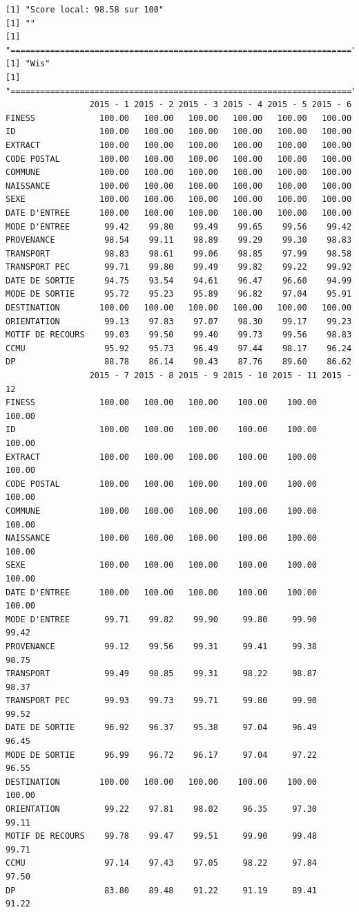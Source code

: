 \documentclass[]{article}
\begin{document}
\begin{verbatim}
[1] "Score local: 98.58 sur 100"
[1] ""
[1] "====================================================================="
[1] "Wis"
[1] "====================================================================="
                 2015 - 1 2015 - 2 2015 - 3 2015 - 4 2015 - 5 2015 - 6
FINESS             100.00   100.00   100.00   100.00   100.00   100.00
ID                 100.00   100.00   100.00   100.00   100.00   100.00
EXTRACT            100.00   100.00   100.00   100.00   100.00   100.00
CODE POSTAL        100.00   100.00   100.00   100.00   100.00   100.00
COMMUNE            100.00   100.00   100.00   100.00   100.00   100.00
NAISSANCE          100.00   100.00   100.00   100.00   100.00   100.00
SEXE               100.00   100.00   100.00   100.00   100.00   100.00
DATE D'ENTREE      100.00   100.00   100.00   100.00   100.00   100.00
MODE D'ENTREE       99.42    99.80    99.49    99.65    99.56    99.42
PROVENANCE          98.54    99.11    98.89    99.29    99.30    98.83
TRANSPORT           98.83    98.61    99.06    98.85    97.99    98.58
TRANSPORT PEC       99.71    99.80    99.49    99.82    99.22    99.92
DATE DE SORTIE      94.75    93.54    94.61    96.47    96.60    94.99
MODE DE SORTIE      95.72    95.23    95.89    96.82    97.04    95.91
DESTINATION        100.00   100.00   100.00   100.00   100.00   100.00
ORIENTATION         99.13    97.83    97.07    98.30    99.17    99.23
MOTIF DE RECOURS    99.03    99.50    99.40    99.73    99.56    98.83
CCMU                95.92    95.73    96.49    97.44    98.17    96.24
DP                  88.78    86.14    90.43    87.76    89.60    86.62
                 2015 - 7 2015 - 8 2015 - 9 2015 - 10 2015 - 11 2015 - 12
FINESS             100.00   100.00   100.00    100.00    100.00    100.00
ID                 100.00   100.00   100.00    100.00    100.00    100.00
EXTRACT            100.00   100.00   100.00    100.00    100.00    100.00
CODE POSTAL        100.00   100.00   100.00    100.00    100.00    100.00
COMMUNE            100.00   100.00   100.00    100.00    100.00    100.00
NAISSANCE          100.00   100.00   100.00    100.00    100.00    100.00
SEXE               100.00   100.00   100.00    100.00    100.00    100.00
DATE D'ENTREE      100.00   100.00   100.00    100.00    100.00    100.00
MODE D'ENTREE       99.71    99.82    99.90     99.80     99.90     99.42
PROVENANCE          99.12    99.56    99.31     99.41     99.38     98.75
TRANSPORT           99.49    98.85    99.31     98.22     98.87     98.37
TRANSPORT PEC       99.93    99.73    99.71     99.80     99.90     99.52
DATE DE SORTIE      96.92    96.37    95.38     97.04     96.49     96.45
MODE DE SORTIE      96.99    96.72    96.17     97.04     97.22     96.55
DESTINATION        100.00   100.00   100.00    100.00    100.00    100.00
ORIENTATION         99.22    97.81    98.02     96.35     97.30     99.11
MOTIF DE RECOURS    99.78    99.47    99.51     99.90     99.48     99.71
CCMU                97.14    97.43    97.05     98.22     97.84     97.50
DP                  83.80    89.48    91.22     91.19     89.41     91.22
\end{verbatim}
\end{document}
